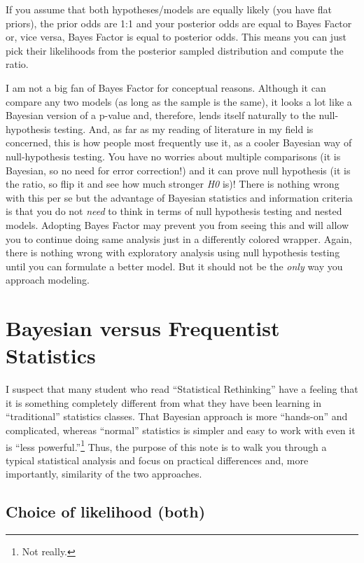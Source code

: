 \documentclass[
]{book}
\begin{document}
If you assume that both hypotheses/models are equally likely (you have flat priors), the prior odds are 1:1 and your posterior odds are equal to Bayes Factor or, vice versa, Bayes Factor is equal to posterior odds. This means you can just pick their likelihoods from the posterior sampled distribution and compute the ratio.

I am not a big fan of Bayes Factor for conceptual reasons. Although it can compare any two models (as long as the sample is the same), it looks a lot like a Bayesian version of a p-value and, therefore, lends itself naturally to the null-hypothesis testing. And, as far as my reading of literature in my field is concerned, this is how people most frequently use it, as a cooler Bayesian way of null-hypothesis testing. You have no worries about multiple comparisons (it is Bayesian, so no need for error correction!) and it can prove null hypothesis (it is the ratio, so flip it and see how much stronger \emph{H0} is)! There is nothing wrong with this per se but the advantage of Bayesian statistics and information criteria is that you do not \emph{need} to think in terms of null hypothesis testing and nested models. Adopting Bayes Factor may prevent you from seeing this and will allow you to continue doing same analysis just in a differently colored wrapper. Again, there is nothing wrong with exploratory analysis using null hypothesis testing until you can formulate a better model. But it should not be the \emph{only} way you approach modeling.

\hypertarget{bayesian-versus-frequentist-statistics}{%
\chapter{Bayesian versus Frequentist Statistics}\label{bayesian-versus-frequentist-statistics}}

I suspect that many student who read ``Statistical Rethinking'' have a feeling that it is something completely different from what they have been learning in ``traditional'' statistics classes. That Bayesian approach is more ``hands-on'' and complicated, whereas ``normal'' statistics is simpler and easy to work with even it is ``less powerful.''\footnote{Not really.} Thus, the purpose of this note is to walk you through a typical statistical analysis and focus on practical differences and, more importantly, similarity of the two approaches.

\hypertarget{choice-of-likelihood-both}{%
\section{Choice of likelihood (both)}\label{choice-of-likelihood-both}}
\end{document}
